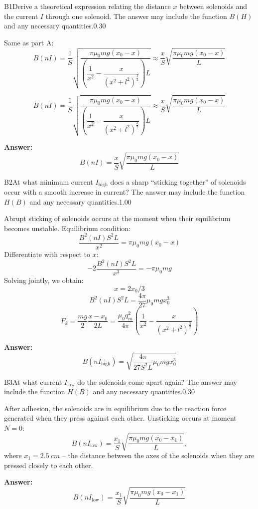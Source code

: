 \documentclass[11pt,a4paper]{article}
\begin{document}
\begin{solcard}{B1}{Derive a theoretical expression relating the distance $x$ between solenoids and the current $I$ through one solenoid. The answer may include the function $B(H)$ and any necessary quantities.}{0.30}

Same as part A: $$B(nI)=\dfrac{ 1}{S} \sqrt{\dfrac{ \pi \mu_{0} m g (x_0-x)}{\left(\dfrac{1}{x^2}-\dfrac{x}{(x^2+l^2)^{\frac{3}{2}}}\right)L}}\approx \dfrac{ x}{S} \sqrt{\dfrac{ \pi \mu_{0} m g (x_0-x)}{L}}$$


$$B(nI)=\dfrac{ 1}{S} \sqrt{\dfrac{ \pi \mu_{0} m g (x_0-x)}{\left(\dfrac{1}{x^2}-\dfrac{x}{(x^2+l^2)^{\frac{3}{2}}}\right)L}}\approx \dfrac{ x}{S} \sqrt{\dfrac{ \pi \mu_{0} m g (x_0-x)}{L}}$$

\par\smallskip\noindent\textbf{Answer:} $$B(nI)=\dfrac{ x}{S} \sqrt{\dfrac{ \pi \mu_{0} m g (x_0-x)}{L}}$$
\end{solcard}

\begin{solcard}{B2}{At what minimum current $I_\mathrm{high}$ does a sharp “sticking together” of solenoids occur with a smooth increase in current? The answer may include the function $H(B)$ and any necessary quantities.}{1.00}

Abrupt sticking of solenoids occurs at the moment when their equilibrium becomes unstable. Equilibrium condition: \[\dfrac{B^2(nI)S^2L}{x^2}= \pi \mu_{0} m g (x_0-x)\]Differentiate with respect to $x$: \[-2\dfrac{B^2(nI)S^2L}{x^3}=- \pi \mu_{0} m g \]Solving jointly, we obtain: \[x=2x_0/3\]\[B^2(nI)S^2L=\dfrac{4\pi}{27}\mu_{0} m g x_0^3\] $$F_{k}=\frac{m g}{2} \frac{x-x_{0}}{2L}=\dfrac{\mu_0 q_m^2}{4\pi}\left(\frac{1}{x^2}-\dfrac{x}{(x^2+l^2)^{\frac{3}{2}}}\right)$$

\par\smallskip\noindent\textbf{Answer:} \[B(nI_{\operatorname{high}})=\sqrt{\dfrac{4\pi}{27S^2L}\mu_{0} m g x_0^3}\]
\end{solcard}

\begin{solcard}{B3}{At what current $I_\mathrm{low}$ do the solenoids come apart again? The answer may include the function $H(B)$ and any necessary quantities.}{0.30}

After adhesion, the solenoids are in equilibrium due to the reaction force generated when they press against each other. Unsticking occurs at moment $N=0$: $$B(nI_{\operatorname{low}})=\dfrac{ x_1}{S} \sqrt{\dfrac{ \pi \mu_{0} m g (x_0-x_1)}{L}},$$where $x_1=2.5~ cm$ – the distance between the axes of the solenoids when they are pressed closely to each other.

\par\smallskip\noindent\textbf{Answer:} $$B(nI_{\operatorname{low}})=\dfrac{ x_1}{S} \sqrt{\dfrac{\pi \mu_{0} m g (x_0-x_1)}{L}}$$
\end{solcard}
\end{document}
